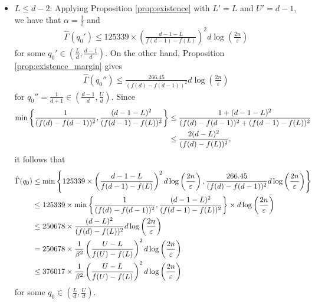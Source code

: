\documentclass[onecolumn,letterpaper]{IEEEtran}
\newcommand{\cp}{{q}}
\newcommand{\up}{{U}}
\newcommand{\lw}{{L}}
\newcommand{\ap}{{\alpha}}
\newcommand{\bet}{{\beta}}
\newcommand{\exifinal}{{ 376017 \times \frac{1}{\bet^2} \left( \frac{\up-\lw}{f(\up)-f(\lw)} \right)^2  d\log \left( \frac{2n}{\varepsilon } \right)}}
\newcommand{\alp}{{\ap}}
\newcommand{\ftaup}{{\hat{\Gamma}}}
\newcommand{\cpns}{\cp_0}
\newcommand{\fTpns}{\ftaup (\cpns)}
\begin{document}
\begin{itemize}
\item \underline{$\lw\leq d-2$}: Applying Proposition \ref{prop:existence} with $\lw'=\lw$ and $\up'=d-1$, we have that $\alp=\frac 1 2$ and 
\begin{align}
    \ftaup(\cpns')  \le 125339 \times \left( \frac{d-1-\lw}{f(d-1)-f(\lw)} \right)^2  d\log \left( \frac{2n}{\varepsilon } \right)
\end{align}
for some $\cpns' \in \left(\frac \lw d, \frac {d-1} {d}\right)$.
On the other hand, Proposition \ref{prop:existence_margin} gives
\begin{align}
   \ftaup(\cpns'') \le \frac{266.45}{(f(d)-f(d-1))^2} d \log \left( \frac{2n}{\varepsilon} \right)
\end{align}
for $\cpns''=\frac 1 {d+1}\in \left(\frac{d-1}{d},\frac{\up}{d}\right)$. Since 
\begin{align}
    \min \left\{ \frac{1}{(f(d)-f(d-1))^2} , \frac{(d-1-\lw)^2}{(f(d-1)-f(\lw))^2} \right\}
    &\leq \frac{1+(d-1-\lw)^2}{(f(d)-f(d-1))^2 + (f(d-1)-f(\lw))^2} \notag\\ 
    &\le \frac{2(d-\lw)^2}{(f(d)-f(\lw))^2}, 
\end{align}
it follows that 
\begin{align}
    \fTpns &\le \min \left\{ 125339 \times \left( \frac{d-1-\lw}{f(d-1)-f(\lw)} \right)^2  d\log \left( \frac{2n}{\varepsilon } \right) , \frac{266.45}{(f(d)-f(d-1))^2} d \log \left( \frac{2n}{\varepsilon} \right) \right\} \notag\\
    &\le 125339 \times \min \left\{ \frac{1}{(f(d)-f(d-1))^2} , \frac{(d-1-\lw)^2}{(f(d-1)-f(\lw))^2} \right\} \times d\log \left( \frac{2n}{\varepsilon } \right) \notag\\
    &\le 250678 \times \frac{(d-\lw)^2}{(f(d)-f(\lw))^2}  d\log \left( \frac{2n}{\varepsilon } \right) \notag\\
    &= 250678 \times \frac{1}{\bet^2} \left( \frac{\up-\lw}{f(\up)-f(\lw)} \right)^2  d\log \left( \frac{2n}{\varepsilon } \right) \notag\\ 
    &\le \exifinal
\end{align}
for some $\cpns \in \left( \frac{\lw}{d} , \frac{\up}{d} \right)$. 
\end{itemize}
\end{document}
